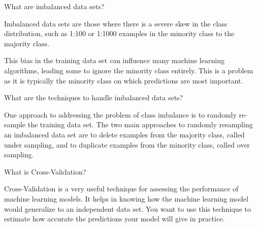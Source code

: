 	\begin{qanda}
		\begin{question}
What are imbalanced data sets?
		\end{question}

		\begin{answer}
Imbalanced data sets are those where there is a severe skew in the class distribution, such as 1:100 or 1:1000 examples in the minority class to the majority class.

This bias in the training data set can influence many machine learning algorithms, leading some to ignore the minority class entirely. This is a problem as it is typically the minority class on which predictions are most important.
		\end{answer}
	\end{qanda}

	\begin{qanda}
		\begin{question}
What are the techniques to handle imbalanced data sets?
		\end{question}

		\begin{answer}
One approach to addressing the problem of class imbalance is to randomly re-sample the training data set. The two main approaches to randomly resampling an imbalanced data set are to delete examples from the majority class, called under sampling, and to duplicate examples from the minority class, called over sampling.
		\end{answer}
	\end{qanda}

	\begin{qanda}
		\begin{question}
What is Cross-Validation?
		\end{question}

		\begin{answer}
Cross-Validation is a very useful technique for assessing the performance of machine learning models. It helps in knowing how the machine learning model would generalize to an independent data set. You want to use this technique to estimate how accurate the predictions your model will give in practice.
		\end{answer}
	\end{qanda}

